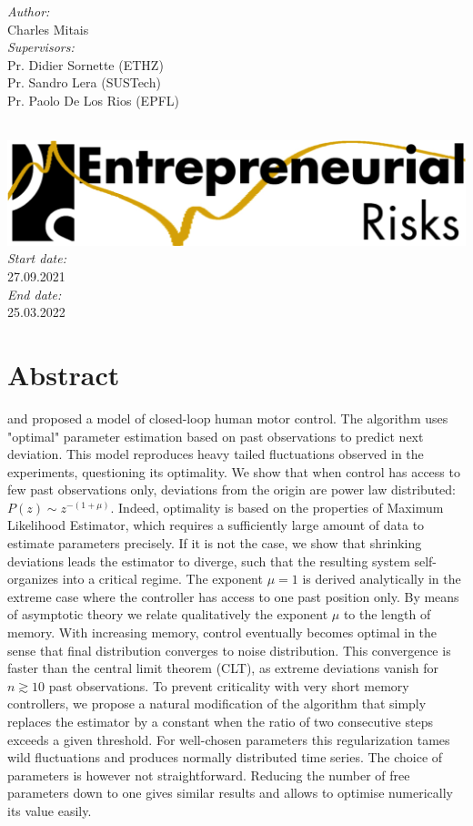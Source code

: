 \documentclass[a4paper, 11pt]{report}
\begin{document}
\begin{titlepage}
\centering
\begin{minipage}{0.4\textwidth}
\centering
\emph{Author:}\\
Charles Mitais \\ %
[1.2cm]
\emph{Supervisors:} \\
Pr. Didier Sornette (ETHZ)\\
Pr. Sandro Lera (SUSTech)\\
Pr. Paolo De Los Rios (EPFL)
\end{minipage}\\[1.3cm]	
\includegraphics[width=.5\textwidth]{logo-chair}	\\
[1.5cm]
\emph{Start date: } \\
27.09.2021\\[.2cm]
\emph{End date: } \\
25.03.2022\\
\end{titlepage}




\chapter*{Abstract}
\citet{OptCont} and \citet{FrontNanoScience} proposed a model of closed-loop human motor control. The algorithm uses "optimal" parameter estimation based on past observations to predict next deviation. This model reproduces heavy tailed fluctuations observed in the experiments, questioning its optimality. We show that when control has access to few past observations only, deviations from the origin are power law distributed: $P(z)\sim z^{-(1+\mu)}$. Indeed, optimality is based on the properties of Maximum Likelihood Estimator, which requires a sufficiently large amount of data to estimate parameters precisely. If it is not the case, we show that shrinking deviations leads the estimator to diverge, such that the resulting system self-organizes into a critical regime. The exponent $\mu=1$ is derived analytically in the extreme case where the controller has access to one past position only. By means of asymptotic theory we relate qualitatively the exponent $\mu$ to the length of memory. With increasing memory, control eventually becomes optimal in the sense that final distribution converges to noise distribution. This convergence is faster than the central limit theorem (CLT), as extreme deviations vanish for $n\gtrsim 10$ past observations. To prevent criticality with very short memory controllers, we propose a natural modification of the algorithm that simply replaces the estimator by a constant when the ratio of two consecutive steps exceeds a given threshold. For well-chosen parameters this regularization tames wild fluctuations and produces normally distributed time series. The choice of parameters is however not straightforward. Reducing the number of free parameters down to one gives similar results and allows to optimise numerically its value easily.
\end{document}
